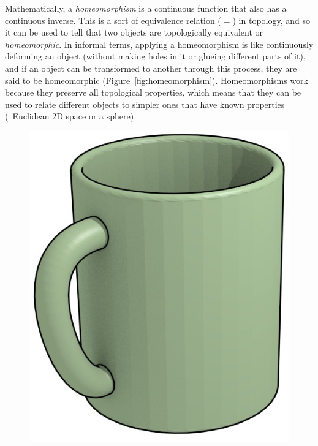 Mathematically, a \emph{homeomorphism} is a continuous function that also has a continuous inverse.
This is a sort of equivalence relation (\(=\)) in topology, and so it can be used to tell that two objects are topologically equivalent or \emph{homeomorphic}.
In informal terms, applying a homeomorphism is like continuously deforming an object (without making holes in it or glueing different parts of it), and if an object can be transformed to another through this process, they are said to be homeomorphic (Figure~\ref{fig:homeomorphism}).
Homeomorphisms work because they preserve all topological properties, which means that they can be used to relate different objects to simpler ones that have known properties (\eg\ Euclidean 2D space or a sphere).

\begin{marginfigure}
\centering
\begin{subfigure}[b]{\linewidth}
\includegraphics[width=\linewidth]{figs/mug}
\caption{}%
\label{subfig:mug}
\end{subfigure}
\\
\begin{subfigure}[b]{\linewidth}

\end{subfigure}
\end{marginfigure}
